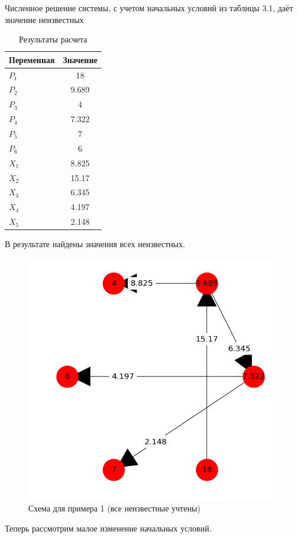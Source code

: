 Численное решение системы, с учетом начальных условий из таблицы 3.1, даёт значение неизвестных

\begin{table}[h!]
  \centering
    \begin{tabular}{| l | c |}
    \hline
    Переменная & Значение \\ \hline
    $ P_1 $ & 18 \\ \hline
    $ P_2 $ & 9.689 \\ \hline
    $ P_3 $ & 4 \\ \hline
    $ P_4 $ & 7.322 \\ \hline
    $ P_5 $ & 7 \\ \hline
    $ P_6 $ & 6 \\ \hline
    $ X_1 $ & 8.825 \\ \hline
    $ X_2 $ & 15.17 \\ \hline
    $ X_3 $ & 6.345 \\ \hline
    $ X_4 $ & 4.197 \\ \hline
    $ X_5 $ & 2.148 \\ \hline

    \end{tabular}
  \caption{Результаты расчета}
\end{table}

В результате найдены значения всех неизвестных. 

\begin{figure}[h]
  \center\includegraphics[width=0.7\linewidth]{picts/example1/3.png}
  \caption{Схема для примера 1 (все неизвестные учтены)}
  \label{fig:example_1}
\end{figure}

Теперь рассмотрим малое изменение начальных условий.

